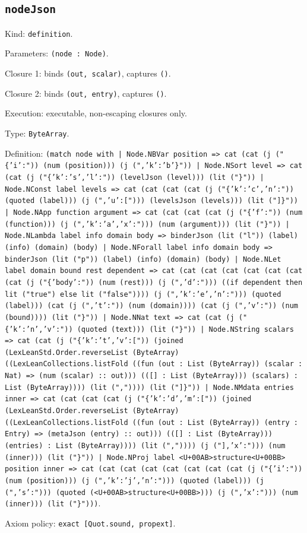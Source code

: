 \documentclass[11pt]{article}
\begin{document}
\subsection*{\texttt{nodeJson}}
\noindent Kind: \texttt{definition}.\par
\noindent Parameters: \texttt{(node : Node)}.\par
\noindent Closure 1: binds \texttt{(out, scalar)}, captures \texttt{()}.\par
\noindent Closure 2: binds \texttt{(out, entry)}, captures \texttt{()}.\par
\noindent Execution: executable, non-escaping closures only.\par
\noindent Type: \texttt{ByteArray}.\par
\noindent Definition: \texttt{(match node with | Node.NBVar position => cat (cat (j ("\{'i':")) (num (position))) (j (",'k':'b'\}")) | Node.NSort level => cat (cat (j ("\{'k':'s','l':")) (levelJson (level))) (lit ("\}")) | Node.NConst label levels => cat (cat (cat (cat (j ("\{'k':'c','n':")) (quoted (label))) (j (",'u':["))) (levelsJson (levels))) (lit ("]\}")) | Node.NApp function argument => cat (cat (cat (cat (j ("\{'f':")) (num (function))) (j (",'k':'a','x':"))) (num (argument))) (lit ("\}")) | Node.NLambda label info domain body => binderJson (lit ("l")) (label) (info) (domain) (body) | Node.NForall label info domain body => binderJson (lit ("p")) (label) (info) (domain) (body) | Node.NLet label domain bound rest dependent => cat (cat (cat (cat (cat (cat (cat (cat (j ("\{'body':")) (num (rest))) (j (",'d':"))) ((if dependent then lit ("true") else lit ("false")))) (j (",'k':'e','n':"))) (quoted (label))) (cat (j (",'t':")) (num (domain)))) (cat (j (",'v':")) (num (bound)))) (lit ("\}")) | Node.NNat text => cat (cat (j ("\{'k':'n','v':")) (quoted (text))) (lit ("\}")) | Node.NString scalars => cat (cat (j ("\{'k':'t','v':[")) (joined (LexLeanStd.Order.reverseList (ByteArray) ((LexLeanCollections.listFold ((fun (out : List (ByteArray)) (scalar : Nat) => (num (scalar) :: out))) (([] : List (ByteArray))) (scalars) : List (ByteArray)))) (lit (",")))) (lit ("]\}")) | Node.NMdata entries inner => cat (cat (cat (cat (j ("\{'k':'d','m':[")) (joined (LexLeanStd.Order.reverseList (ByteArray) ((LexLeanCollections.listFold ((fun (out : List (ByteArray)) (entry : Entry) => (metaJson (entry) :: out))) (([] : List (ByteArray))) (entries) : List (ByteArray)))) (lit (",")))) (j ("],'x':"))) (num (inner))) (lit ("\}")) | Node.NProj label <U+00AB>structure<U+00BB> position inner => cat (cat (cat (cat (cat (cat (cat (cat (j ("\{'i':")) (num (position))) (j (",'k':'j','n':"))) (quoted (label))) (j (",'s':"))) (quoted (<U+00AB>structure<U+00BB>))) (j (",'x':"))) (num (inner))) (lit ("\}")))}.\par
\noindent Axiom policy: \texttt{exact [Quot.sound, propext]}.\par
\end{document}

